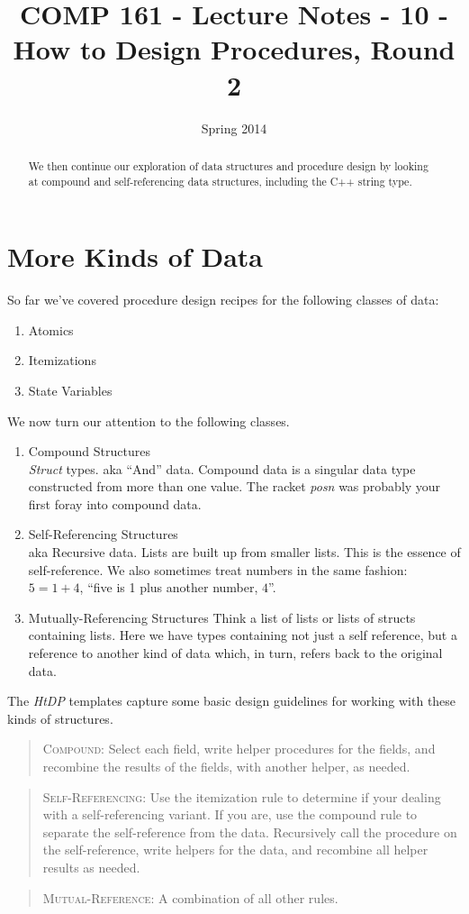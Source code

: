 \documentclass[]{tufte-handout}
\title{COMP 161 - Lecture Notes - 10 - How to Design Procedures, Round 2}
\date{Spring 2014}
\begin{document}
 
\maketitle

\begin{abstract}
We then continue our exploration of data structures and procedure design by looking at compound and self-referencing data structures, including the C++ string type.
\end{abstract}


\section{More Kinds of Data}

So far we've covered procedure design recipes for the following classes of data:
\begin{enumerate}
\item Atomics
\item Itemizations
\item State Variables
\end{enumerate}

We now turn our attention to the following classes.
\begin{enumerate}
\item Compound Structures \\
\textit{Struct} types.  aka ``And'' data.  Compound data is a singular data type constructed from more than one value.  The racket \textit{posn} was probably your first foray into compound data.   
\item Self-Referencing Structures \\
aka Recursive data.  Lists are built up from smaller lists.  This is the essence of self-reference.  We also sometimes treat numbers in the same fashion: $5 = 1 + 4$, ``five is 1 plus another number, $4$''.
\item Mutually-Referencing Structures
Think a list of lists or lists of structs containing lists. Here we have types containing not just a self reference, but a reference to another kind of data which, in turn, refers back to the original data.
\end{enumerate}

The \textit{HtDP} templates capture some basic design guidelines for working with these kinds of structures.
\begin{quote}
\textsc{Compound}: Select each field, write helper procedures for the fields, and recombine the results of the fields, with another helper, as needed.
\end{quote}
\begin{quote}
\textsc{Self-Referencing}: Use the itemization rule to determine if your dealing with a self-referencing variant. If you are, use the compound rule to separate the self-reference from the data. Recursively call the procedure on the self-reference, write helpers for the data, and recombine all helper results as needed.
\end{quote}
\begin{quote}
\textsc{Mutual-Reference}: A combination of all other rules. 
\end{quote}
\end{document}
